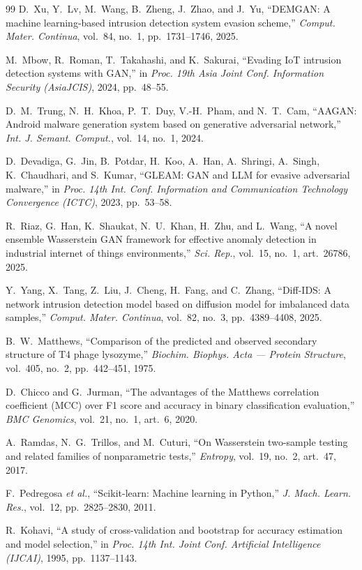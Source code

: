 \documentclass[11pt,a4paper]{article}
\begin{document}
\begin{thebibliography}{99}
 D.~Xu, Y.~Lv, M.~Wang, B.~Zheng, J.~Zhao, and J.~Yu, ``DEMGAN:
A machine learning-based intrusion detection system evasion scheme,''
\emph{Comput. Mater. Continua}, vol.~84, no.~1, pp.~1731--1746, 2025.

 M.~Mbow, R.~Roman, T.~Takahashi, and K.~Sakurai, ``Evading IoT
intrusion detection systems with GAN,'' in \emph{Proc. 19th Asia Joint Conf.
Information Security (AsiaJCIS)}, 2024, pp.~48--55.

 D.~M.~Trung, N.~H.~Khoa, P.~T.~Duy, V.-H.~Pham, and N.~T.~Cam,
``AAGAN: Android malware generation system based on generative adversarial
network,'' \emph{Int. J. Semant. Comput.}, vol.~14, no.~1, 2024.

 D.~Devadiga, G.~Jin, B.~Potdar, H.~Koo, A.~Han, A.~Shringi,
A.~Singh, K.~Chaudhari, and S.~Kumar, ``GLEAM: GAN and LLM for evasive
adversarial malware,'' in \emph{Proc. 14th Int. Conf. Information and
Communication Technology Convergence (ICTC)}, 2023, pp.~53--58.

 R.~Riaz, G.~Han, K.~Shaukat, N.~U.~Khan, H.~Zhu, and L.~Wang,
``A novel ensemble Wasserstein GAN framework for effective anomaly detection in
industrial internet of things environments,'' \emph{Sci. Rep.}, vol.~15, no.~1,
art.~26786, 2025.

 Y.~Yang, X.~Tang, Z.~Liu, J.~Cheng, H.~Fang, and C.~Zhang,
``Diff-IDS: A network intrusion detection model based on diffusion model for
imbalanced data samples,'' \emph{Comput. Mater. Continua}, vol.~82, no.~3,
pp.~4389--4408, 2025.

 B.~W.~Matthews, ``Comparison of the predicted and observed
secondary structure of T4 phage lysozyme,'' \emph{Biochim. Biophys. Acta ---
Protein Structure}, vol.~405, no.~2, pp.~442--451, 1975.

 D.~Chicco and G.~Jurman, ``The advantages of the Matthews
correlation coefficient (MCC) over F1 score and accuracy in binary
classification evaluation,'' \emph{BMC Genomics}, vol.~21, no.~1, art.~6, 2020.

 A.~Ramdas, N.~G.~Trillos, and M.~Cuturi, ``On Wasserstein
two-sample testing and related families of nonparametric tests,''
\emph{Entropy}, vol.~19, no.~2, art.~47, 2017.

 F.~Pedregosa \emph{et al.}, ``Scikit-learn: Machine learning
in Python,'' \emph{J. Mach. Learn. Res.}, vol.~12, pp.~2825--2830, 2011.

 R.~Kohavi, ``A study of cross-validation and bootstrap for
accuracy estimation and model selection,'' in \emph{Proc. 14th Int. Joint Conf.
Artificial Intelligence (IJCAI)}, 1995, pp.~1137--1143.

\end{thebibliography}
\end{document}
